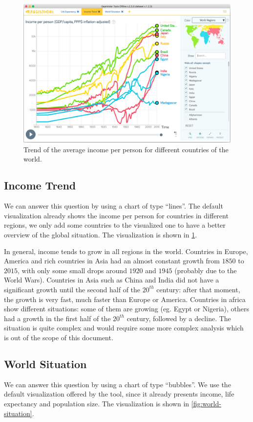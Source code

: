 \begin{figure}[H]
	\centering
	\includegraphics[width=0.95\columnwidth]{figures/income-trend}
	\caption{Trend of the average income per person for different countries of the world.}
	\label{fig:income-trend}
\end{figure}

\subsection{Income Trend}
We can answer this question by using a chart of type ``lines''.
The default visualization already shows the income per person for countries in different regions,
we only add some countries to the visualized one to have a better overview of the global situation.
The visualization is shown in \cref{fig:income-trend}.

In general, income tends to grow in all regions in the world.
Countries in Europe, America and rich countries in Asia had an almost constant growth from $1850$ to $2015$, with only some small drops around $1920$ and $1945$ (probably due to the World Wars).
Countries in Asia such as China and India did not have a significant growth until the second half of the $20^{th}$ century:
after that moment, the growth is very fast, much faster than Europe or America.
Countries in africa show different situations:
some of them are growing (eg. Egypt or Nigeria), others had a growth in the first half of the $20^{th}$ century, followed by a decline.
The situation is quite complex and would require some more complex analysis which is out of the scope of this document.


\subsection{World Situation}
We can answer this question by using a chart of type ``bubbles''.
We use the default visualization offered by the tool, since it already presents income, life expectancy and population size.
The visualization is shown in \cref{fig:world-situation}.

